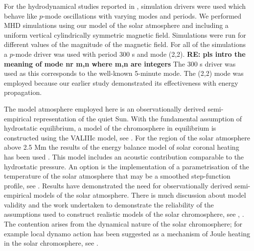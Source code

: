 \documentclass{aastex62}
\begin{document}
For the hydrodynamical studies reported in  \citet{Griffiths2018}, simulation drivers were used which behave like $p$-mode oscillations with varying modes and periods. We performed MHD simulations using our model of the solar atmosphere and including a uniform vertical cylindrically symmetric magnetic field. Simulations were run for different values of the magnitude of the magnetic field. For all of the simulations a $p$-mode driver was used with period 300 s and mode (2,2). {\bf RE: pls intro the meaning of mode nr {m,n} where m,n are integers} The 300 s driver  was used as this corresponds to the well-known 5-minute mode. The (2,2) mode was employed because our earlier study demonstrated its effectiveness with energy propagation.




The model atmosphere employed here is an observationally derived semi-empirical representation of the quiet Sun. With the fundamental assumption of hydrostatic equilibrium, a model of the chromosphere in equilibrium is constructed using the VALIIIc model, see \citet{Vernazza1981}. For the region of the solar atmosphere above 2.5 Mm the results of the energy balance model of solar coronal heating has been used \citep[see][]{McWhirter1975}. This model includes an acoustic contribution comparable to the hydrostatic pressure. An option is the implementation of a parametrisation of the temperature of the solar atmosphere that may be a smoothed step-function profile, see \citet{Murawski2010}. Results have demonstrated the need for observationally derived semi-empirical models of the solar atmosphere. There is much discussion about model validity and the work undertaken to demonstrate the reliability of the assumptions used to construct realistic models of the solar chromosphere, see \citet{Carlsson1995}, \citet{Kalkofen2012}. The contention arises from the dynamical nature of the solar chromosphere; for example local dynamo action has been suggested as a mechanism of Joule heating in the solar chromosphere, see \citet{Leenaarts2011}. 
\end{document}
